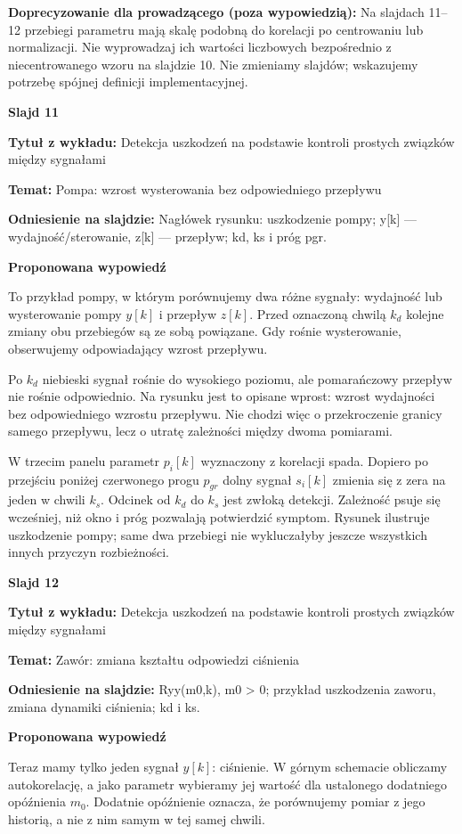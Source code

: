 \documentclass[a4paper,11pt]{article}
\newcommand{\NumerSlajdu}{1}
\newcommand{\Komentarz}[3]{%
  \gdef\NumerSlajdu{#1}%
  {\Large\bfseries Slajd #1\par}\smallskip
  \textbf{Tytuł z wykładu:} #2\par
  \textbf{Temat:} #3\par\medskip
}
\begin{document}
{\small\color{black!65}\textbf{Doprecyzowanie dla prowadzącego (poza wypowiedzią):} Na slajdach 11–12 przebiegi parametru mają skalę podobną do korelacji po centrowaniu lub normalizacji. Nie wyprowadzaj ich wartości liczbowych bezpośrednio z niecentrowanego wzoru na slajdzie 10. Nie zmieniamy slajdów; wskazujemy potrzebę spójnej definicji implementacyjnej.\par}
\clearpage

\Komentarz{11}{Detekcja uszkodzeń na podstawie kontroli prostych związków między sygnałami}{Pompa: wzrost wysterowania bez odpowiedniego przepływu}
{\small\color{black!65}\textbf{Odniesienie na slajdzie:} Nagłówek rysunku: uszkodzenie pompy; y[k] — wydajność/sterowanie, z[k] — przepływ; kd, ks i próg pgr.\par}
\medskip
\textbf{Proponowana wypowiedź}\par
To przykład pompy, w którym porównujemy dwa różne sygnały: wydajność lub wysterowanie pompy $y[k]$ i przepływ $z[k]$. Przed oznaczoną chwilą $k_d$ kolejne zmiany obu przebiegów są ze sobą powiązane. Gdy rośnie wysterowanie, obserwujemy odpowiadający wzrost przepływu.

Po $k_d$ niebieski sygnał rośnie do wysokiego poziomu, ale pomarańczowy przepływ nie rośnie odpowiednio. Na rysunku jest to opisane wprost: wzrost wydajności bez odpowiedniego wzrostu przepływu. Nie chodzi więc o przekroczenie granicy samego przepływu, lecz o utratę zależności między dwoma pomiarami.

W trzecim panelu parametr $p_i[k]$ wyznaczony z korelacji spada. Dopiero po przejściu poniżej czerwonego progu $p_{gr}$ dolny sygnał $s_i[k]$ zmienia się z zera na jeden w chwili $k_s$. Odcinek od $k_d$ do $k_s$ jest zwłoką detekcji. Zależność psuje się wcześniej, niż okno i próg pozwalają potwierdzić symptom. Rysunek ilustruje uszkodzenie pompy; same dwa przebiegi nie wykluczałyby jeszcze wszystkich innych przyczyn rozbieżności.
\clearpage

\Komentarz{12}{Detekcja uszkodzeń na podstawie kontroli prostych związków między sygnałami}{Zawór: zmiana kształtu odpowiedzi ciśnienia}
{\small\color{black!65}\textbf{Odniesienie na slajdzie:} Ryy(m0,k), m0 > 0; przykład uszkodzenia zaworu, zmiana dynamiki ciśnienia; kd i ks.\par}
\medskip
\textbf{Proponowana wypowiedź}\par
Teraz mamy tylko jeden sygnał $y[k]$: ciśnienie. W górnym schemacie obliczamy autokorelację, a jako parametr wybieramy jej wartość dla ustalonego dodatniego opóźnienia $m_0$. Dodatnie opóźnienie oznacza, że porównujemy pomiar z jego historią, a nie z nim samym w tej samej chwili.
\end{document}
